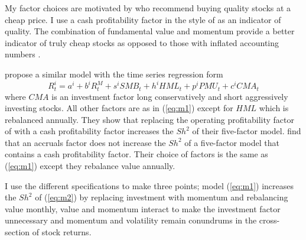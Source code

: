 My factor choices are motivated by \textcite{graham1934security} who recommend buying
quality stocks at a cheap price. I use a cash profitability factor in the style of
\textcite{ball2016accruals} as an indicator of quality. The combination of fundamental
value and momentum provide a better indicator of truly cheap stocks as opposed to those
with inflated accounting numbers \textcite{kok2017facts}.

\textcite{fama2016choosing} propose a similar model with the time series regression form
\begin{equation}
\label{eq:m2}
R_t^i=a^i+b^iR_t^M+s^iSMB_t+h^iHML_t+p^iPMU_t+c^iCMA_t
\end{equation}
where $CMA$ is an investment factor long conservatively and short aggressively investing
stocks. All other factors are as in (\ref{eq:m1}) except for $HML$ which is rebalanced
annually. They show that replacing the operating profitability factor of
\textcite{fama2015five} with a cash profitability factor increases the $Sh^2$ of their
five-factor model. \textcite{ball2016accruals} find that an accruals factor does not
increase the $Sh^2$ of a five-factor model that contains a cash profitability factor.
Their choice of factors is the same as (\ref{eq:m1}) except they rebalance value annually.

I use the different specifications to make three points; model (\ref{eq:m1}) increases the
$Sh^2$ of (\ref{eq:m2}) by replacing investment with momentum and rebalancing value
monthly, value and momentum interact to make the investment factor unnecessary and
momentum and volatility remain conundrums in the cross-section of stock returns.
